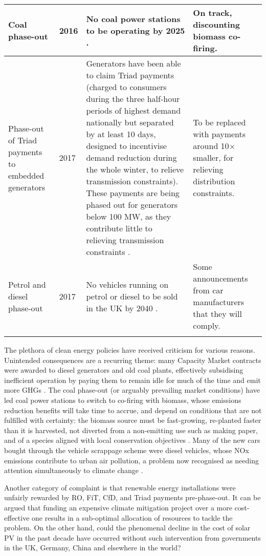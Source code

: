 \documentclass[report_18month.tex]{subfiles}
\begin{document}
\begin{longtable}{ M{2.4cm} M{1.3cm} M{7.6cm} M{3cm} }
\hline
Coal phase-out & 2016 & No coal power stations to be operating by 2025 \citep{govuk2016coal}. & On track, discounting biomass co-firing. \\
\hline
Phase-out of Triad payments to embedded generators & 2017 & Generators have been able to claim Triad payments (charged to consumers during the three half-hour periods of highest demand nationally but separated by at least 10 days, designed to incentivise demand reduction during the whole winter, to relieve transmission constraints). These payments are being phased out for generators below 100 MW, as they contribute little to relieving transmission constraints \citep{ofgem2017triads}. & To be replaced with payments around 10$\times$ smaller, for relieving distribution constraints. \\
\hline
Petrol and diesel phase-out & 2017 & No vehicles running on petrol or diesel to be sold in the UK by 2040 \citep{petroff2017ev}. & Some announcements from car manufacturers that they will comply. \\ 
\hline
\label{table:UKactions}
\end{longtable}

The plethora of clean energy policies have received criticism for various reasons. Unintended consequences are a recurring theme: many Capacity Market contracts were awarded to diesel generators and old coal plants, effectively subsidising inefficient operation by paying them to remain idle for much of the time and emit more GHGs \citep{mattholie2017cm}. The coal phase-out (or arguably prevailing market conditions) have led coal power stations to switch to co-firing with biomass, whose emissions reduction benefits will take time to accrue, and depend on conditions that are not fulfilled with certainty: the biomass source must be fast-growing, re-planted faster than it is harvested, not diverted from a non-emitting use such as making paper, and of a species aligned with local conservation objectives \citep{lamers2013biomass}. Many of the new cars bought through the vehicle scrappage scheme were diesel vehicles, whose NOx emissions contribute to urban air pollution, a problem now recognised as needing attention simultaneously to climate change \citep{petroff2017ev}.

Another category of complaint is that renewable energy installations were unfairly rewarded by RO, FiT, CfD, and Triad payments pre-phase-out. It can be argued that funding an expensive climate mitigation project over a more cost-effective one results in a sub-optimal allocation of resources to tackle the problem. On the other hand, could the phenomenal decline in the cost of solar PV in the past decade have occurred without such intervention from governments in the UK, Germany, China and elsewhere in the world?
\end{document}
